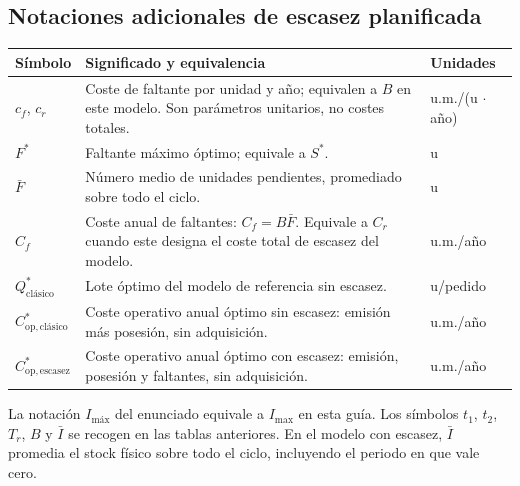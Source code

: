 \documentclass[11pt,a4paper]{article}
\begin{document}
\subsection{Notaciones adicionales de escasez planificada}
\begin{longtable}{@{}p{2.8cm}p{7.2cm}p{3.5cm}@{}}
    \toprule
    Símbolo                       & Significado y equivalencia                                                                                           & Unidades             \\
    \midrule
    \endhead
    $c_f$, $c_r$                  & Coste de faltante por unidad y año; equivalen a $B$ en este modelo. Son parámetros unitarios, no costes totales.     & u.m./(u $\cdot$ año) \\
    $F^{*}$                       & Faltante máximo óptimo; equivale a $S^{*}$.                                                                          & u                    \\
    $\bar{F}$                     & Número medio de unidades pendientes, promediado sobre todo el ciclo.                                                 & u                    \\
    $C_f$                         & Coste anual de faltantes: $C_f=B\bar{F}$. Equivale a $C_r$ cuando este designa el coste total de escasez del modelo. & u.m./año             \\
    $Q_{\text{clásico}}^{*}$      & Lote óptimo del modelo de referencia sin escasez.                                                                    & u/pedido             \\
    $C_{\mathrm{op,clásico}}^{*}$ & Coste operativo anual óptimo sin escasez: emisión más posesión, sin adquisición.                                     & u.m./año             \\
    $C_{\mathrm{op,escasez}}^{*}$ & Coste operativo anual óptimo con escasez: emisión, posesión y faltantes, sin adquisición.                            & u.m./año             \\
    \bottomrule
\end{longtable}
La notación $I_{\text{máx}}$ del enunciado equivale a $I_{\max}$ en esta guía. Los símbolos $t_1$, $t_2$, $T_r$, $B$ y $\bar{I}$ se recogen en las tablas anteriores. En el modelo con escasez, $\bar{I}$ promedia el stock físico sobre todo el ciclo, incluyendo el periodo en que vale cero.
\end{document}
